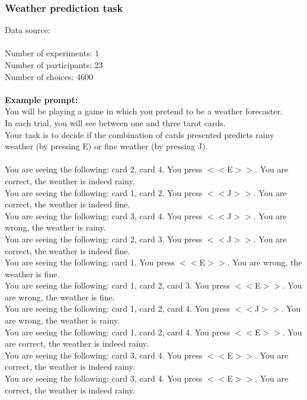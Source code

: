 \documentclass[pdflatex,sn-nature]{sn-jnl}%
\theoremstyle{thmstyleone}%
\theoremstyle{thmstyletwo}%
\theoremstyle{thmstylethree}%
\begin{document}
\subsubsection*{Weather prediction task}
Data source: \cite{speekenbrink2008learning} \\ $~$ \\
Number of experiments: 1 $~$\\ 
Number of participants: 23 $~$\\ 
Number of choices: 4600 $~$\\ 
 $~$\\ 
\textbf{Example prompt:}
 $~$\\ 
You will be playing a game in which you pretend to be a weather forecaster. $~$\\ 
In each trial, you will see between one and three tarot cards. $~$\\ 
Your task is to decide if the combination of cards presented predicts rainy weather (by pressing E) or fine weather (by pressing J). $~$\\ 
 $~$\\ 
You are seeing the following: card 2, card 4. You press $<<$E$>>$. You are correct, the weather is indeed rainy. $~$\\ 
You are seeing the following: card 1, card 2. You press $<<$J$>>$. You are correct, the weather is indeed fine. $~$\\ 
You are seeing the following: card 3, card 4. You press $<<$J$>>$. You are wrong, the weather is rainy. $~$\\ 
You are seeing the following: card 2, card 3. You press $<<$J$>>$. You are correct, the weather is indeed fine. $~$\\ 
You are seeing the following: card 1. You press $<<$E$>>$. You are wrong, the weather is fine. $~$\\ 
You are seeing the following: card 1, card 2, card 3. You press $<<$E$>>$. You are wrong, the weather is fine. $~$\\ 
You are seeing the following: card 1, card 2, card 4. You press $<<$J$>>$. You are wrong, the weather is rainy. $~$\\ 
You are seeing the following: card 1, card 2, card 4. You press $<<$E$>>$. You are correct, the weather is indeed rainy. $~$\\ 
You are seeing the following: card 3, card 4. You press $<<$E$>>$. You are correct, the weather is indeed rainy. $~$\\ 
You are seeing the following: card 3, card 4. You press $<<$E$>>$. You are correct, the weather is indeed rainy. $~$\\ 
\end{document}
